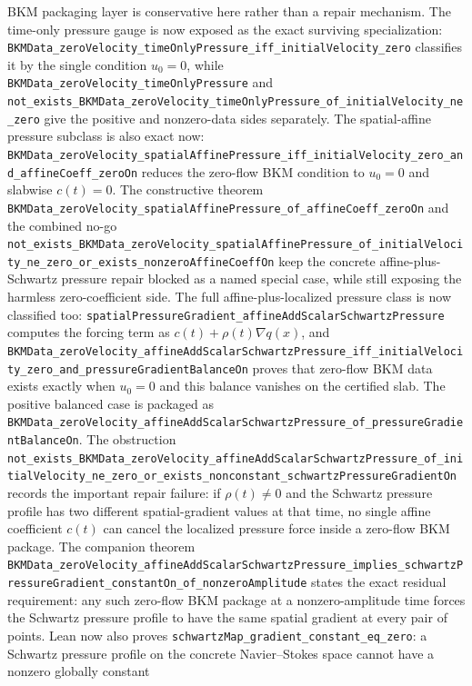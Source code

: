 \documentclass[11pt]{article}
\theoremstyle{remark}
\begin{document}
BKM packaging layer is conservative here rather than a repair mechanism.  The
time-only pressure gauge is now exposed as the exact surviving specialization:
\texttt{BKMData\_zeroVelocity\_timeOnlyPressure\_iff\_initialVelocity\_zero}
classifies it by the single condition \(u_0=0\), while
\texttt{BKMData\_zeroVelocity\_timeOnlyPressure} and
\texttt{not\_exists\_BKMData\_zeroVelocity\_timeOnlyPressure\_of\_initialVelocity\_ne\_zero}
give the positive and nonzero-data sides separately.  The spatial-affine
pressure subclass is also exact now:
\texttt{BKMData\_zeroVelocity\_spatialAffinePressure\_iff\_initialVelocity\_zero\_and\_affineCoeff\_zeroOn}
reduces the zero-flow BKM condition to \(u_0=0\) and slabwise \(c(t)=0\).
The constructive theorem
\texttt{BKMData\_zeroVelocity\_spatialAffinePressure\_of\_affineCoeff\_zeroOn}
and the combined no-go
\texttt{not\_exists\_BKMData\_zeroVelocity\_spatialAffinePressure\_of\_initialVelocity\_ne\_zero\_or\_exists\_nonzeroAffineCoeffOn}
keep the concrete affine-plus-Schwartz pressure repair blocked as a named
special case, while still exposing the harmless zero-coefficient side.
The full affine-plus-localized pressure class is now classified too:
\texttt{spatialPressureGradient\_affineAddScalarSchwartzPressure} computes the
forcing term as \(c(t)+\rho(t)\nabla q(x)\), and
\texttt{BKMData\_zeroVelocity\_affineAddScalarSchwartzPressure\_iff\_initialVelocity\_zero\_and\_pressureGradientBalanceOn}
proves that zero-flow BKM data exists exactly when \(u_0=0\) and this balance
vanishes on the certified slab.  The positive balanced case is packaged as
\texttt{BKMData\_zeroVelocity\_affineAddScalarSchwartzPressure\_of\_pressureGradientBalanceOn}.
The obstruction
\texttt{not\_exists\_BKMData\_zeroVelocity\_affineAddScalarSchwartzPressure\_of\_initialVelocity\_ne\_zero\_or\_exists\_nonconstant\_schwartzPressureGradientOn}
records the important repair failure: if \(\rho(t)\neq0\) and the Schwartz
pressure profile has two different spatial-gradient values at that time, no
single affine coefficient \(c(t)\) can cancel the localized pressure force
inside a zero-flow BKM package.  The companion theorem
\texttt{BKMData\_zeroVelocity\_affineAddScalarSchwartzPressure\_implies\_schwartzPressureGradient\_constantOn\_of\_nonzeroAmplitude}
states the exact residual requirement: any such zero-flow BKM package at a
nonzero-amplitude time forces the Schwartz pressure profile to have the same
spatial gradient at every pair of points.  Lean now also proves
\texttt{schwartzMap\_gradient\_constant\_eq\_zero}: a Schwartz pressure profile
on the concrete Navier--Stokes space cannot have a nonzero globally constant
\end{document}
